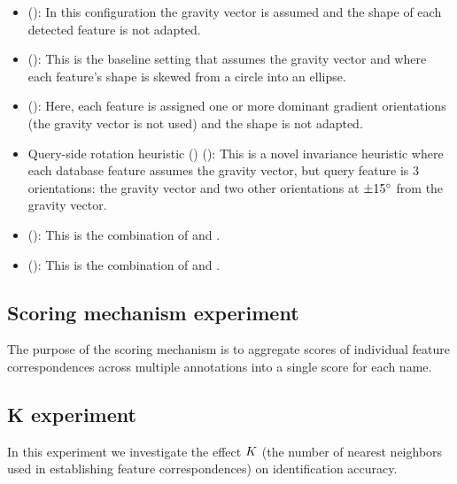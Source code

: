         \begin{itemize}
            \item \NoInvar{} (): %
                In this configuration the gravity vector is assumed and the shape of each detected feature is not
                  adapted.
                
            \item \AIAlone{} (): %
                This is the baseline setting that assumes the gravity vector and where each feature's shape is skewed
                  from a circle into an ellipse.
                
            \item \RIAlone{} (): %
                Here, each feature is assigned one or more dominant gradient orientations (the gravity vector is not
                  used) and the shape is not adapted.
                
            \item Query-side rotation heuristic (\QRHCirc{})
                (): %
                This is a novel invariance heuristic where each {database} feature assumes the gravity vector, but
                  {query} feature is $3$ orientations:
                the gravity vector and two other orientations at $\pm15^{\circ}$ from the gravity vector.
                
            \item \QRHEll{} (): %
                This is the combination of \QRHCirc{} and \AIAlone{}.
                
            \item \AIRI{} (): %
                This is the combination of \RIAlone{} and \AIAlone{}.
                
        \end{itemize}

    \subsection{Scoring mechanism experiment}
        The purpose of the scoring mechanism is to aggregate scores of individual feature correspondences across
          multiple annotations into a single score for each name.
        
    \subsection{K experiment}
        In this experiment we investigate the effect $K$ (the number of nearest neighbors used in establishing
          feature correspondences) on identification accuracy.
        
